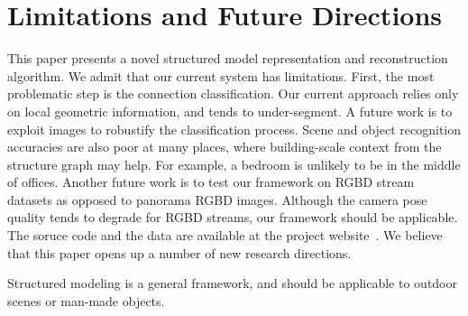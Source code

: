 \section{Limitations and Future Directions}

This paper presents a novel structured model representation and
reconstruction algorithm.
We admit that our current system has limitations. First, the most
problematic step is the connection classification. Our current approach
relies only on local geometric information, and tends to under-segment.
A future work is to exploit images to robustify the classification
process. Scene and object recognition accuracies are also poor at many
places, where building-scale context from the structure graph may
help. For example, a bedroom is unlikely to be in the middle of offices.
Another future work is to test our framework on RGBD stream datasets as
opposed to panorama RGBD images. Although the camera pose quality tends
to degrade for RGBD streams, our framework should be applicable.
The soruce code and the data are available at the project
website~\cite{SIMProject}.
We believe that this paper opens up a number of new research directions.

Structured modeling is a general framework, and should be applicable to
outdoor scenes or man-made objects.
%

